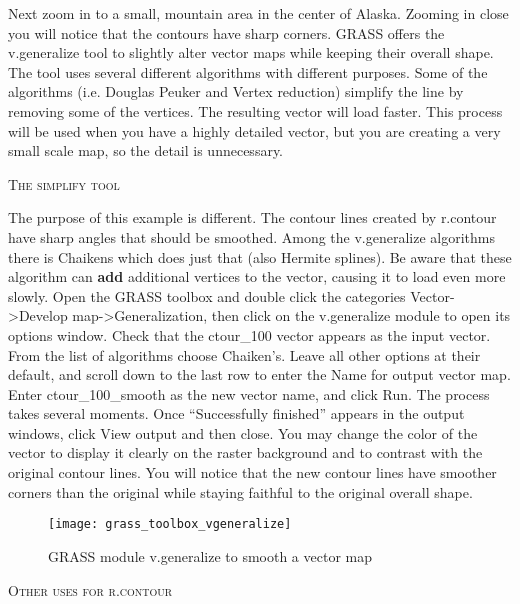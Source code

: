 Next zoom in to a small, mountain area in the center of Alaska. Zooming in close you will notice that the contours have sharp corners. GRASS offers the v.generalize tool to slightly alter vector maps while keeping their overall shape. The tool uses several different algorithms with different purposes. Some of the algorithms (i.e. Douglas Peuker and Vertex reduction) simplify the line by removing some of the vertices. The resulting vector will load faster. This process will be used when you have a highly detailed vector, but you are creating a very small scale map, so the detail is unnecessary. 
\begin{Tip}\caption{\textsc{The simplify tool}}
\end{Tip}  
The purpose of this example is different. The contour lines created by r.contour have sharp angles that should be smoothed.  Among the v.generalize algorithms there is Chaikens which does just that (also Hermite splines). Be aware that these algorithm can \textbf{add}  additional vertices to the vector, causing it to load even more slowly.
Open the GRASS toolbox and double click the categories Vector->Develop map->Generalization, then click on the v.generalize module to open its options window. Check that the ctour_100 vector appears as the input vector. From the list of algorithms choose Chaiken's. Leave all other options at their default, and scroll down to the last row to enter the Name for output vector map. Enter ctour_100_smooth as the new vector name, and click Run. The process takes several moments.  Once ``Successfully finished'' appears in the output windows, click View output and then close. You may change the color of the vector to display it clearly on the raster background and to contrast with the original contour lines. You will notice that the new contour lines have smoother corners than the original while staying faithful to the original overall shape.
\begin{figure}[h]
 \begin{center}
 \caption{GRASS module v.generalize to smooth a vector map \nixcaption}\label{fig:grass_toolbox_vgeneralize}
 \texttt{[image: grass\_toolbox\_vgeneralize]}
 \end{center}
\end{figure}

\begin{Tip}\caption{\textsc{Other uses for r.contour}}
\end{Tip}  

